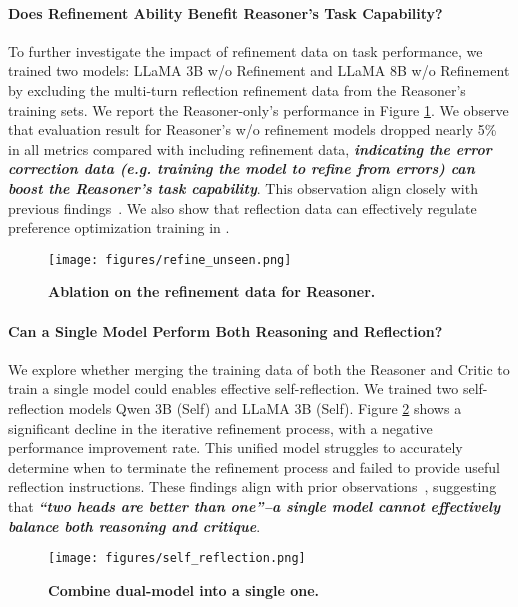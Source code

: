 \paragraph{Does Refinement Ability Benefit Reasoner's Task Capability?}
To further investigate the impact of refinement data on task performance, we trained two models: LLaMA 3B w/o Refinement and LLaMA 8B w/o Refinement by excluding the multi-turn reflection refinement data from the Reasoner's training sets.
We report the Reasoner-only's performance in Figure \ref{fig:refine_unseen}.
We observe that evaluation result for Reasoner's w/o refinement models dropped nearly 5\% in all metrics compared with including refinement data, \textbf{\emph{indicating the error correction data (e.g. training the model to refine from errors) can boost the Reasoner’s task capability}}.
This observation align closely with previous findings~\cite{tong-etal-2024-llms,kamoi-etal-2024-llms}.
We also show that reflection data can effectively regulate preference optimization training in \textsection{\ref{sec:rationale_dpo}}.
\begin{figure}[!h]
\centering
\vspace{-2mm}
\texttt{[image: figures/refine\_unseen.png]}
\vspace{-2mm}
\caption{\small \textbf{Ablation on the refinement data for Reasoner.}}
\label{fig:refine_unseen}\vspace{-4mm}
\end{figure}


\paragraph{Can a Single Model Perform Both Reasoning and Reflection?}
We explore whether merging the training data of both the Reasoner and Critic to train a single model could enables effective self-reflection. We trained two self-reflection models Qwen 3B (Self) and LLaMA 3B (Self). Figure \ref{fig:self_reflection} shows a significant decline in the iterative refinement process, with a negative performance improvement rate. This unified model struggles to accurately determine when to terminate the refinement process and failed to provide useful reflection instructions. These findings align with prior observations~\cite{Huang2023LargeLM}, suggesting that \textbf{\emph{``two heads are better than one''--a single model cannot effectively balance both reasoning and critique}}. %
\begin{figure}[!h]
\centering
\vspace{-2mm}
\texttt{[image: figures/self\_reflection.png]}
\vspace{-2mm}
\caption{\small\textbf{Combine dual-model into a single one.}}
\label{fig:self_reflection}\vspace{-6mm}
\end{figure}

